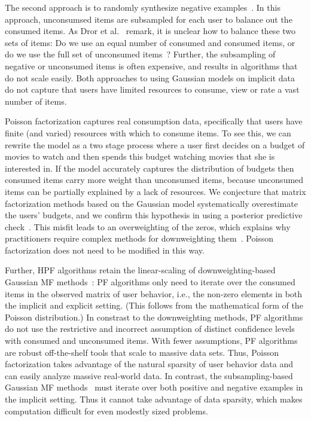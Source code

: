 The second approach is to randomly synthesize negative
examples~\cite{Dror:2012a, Gantner:2012p9364, Paquet:2013p9197}. In
this approach, unconsumsed items are subsampled for each user to
balance out the consumed items. As Dror et al.~\cite{Dror:2012a}
remark, it is unclear how to balance these two sets of items: Do we
use an equal number of consumed and consumed items, or do we use the
full set of unconsumed items~\cite{Cremonesi:2010, Hu:2008p9402}?
Further, the subsampling of negative or unconsumed items is often
expensive, and results in algorithms that do not scale easily. Both
approaches to using Gaussian models on implicit data do not capture
that users have limited resources to consume, view or rate a vast
number of items.

Poisson factorization captures real consumption data, specifically
that users have finite (and varied) resources with which to consume
items.  To see this, we can rewrite the model as a two stage process
where a user first decides on a budget of movies to watch and then
spends this budget watching movies that she is interested in. If the
model accurately captures the distribution of budgets then consumed
items carry more weight than unconsumed items, because unconsumed
items can be partially explained by a lack of resources. We conjecture
that matrix factorization methods based on the Gaussian model
systematically overestimate the users' budgets, and we confirm this
hypothesis in  using a posterior predictive
check~\cite{Gelman:1996}. This misfit leads to an overweighting of the
zeros, which explains why practitioners require complex methods for
downweighting
them~\cite{Hu:2008p9402,Gantner:2012p9364,Dror:2012a,Paquet:2013p9197}.
Poisson factorization does not need to be modified in this way.

Further, HPF algorithms retain the linear-scaling of
downweighting-based Gaussian MF methods~\cite{Hu:2008p9402}: PF
algorithms only need to iterate over the consumed items in the
observed matrix of user behavior, i.e., the non-zero elements in both
the implicit and explicit setting. (This follows from the mathematical
form of the Poisson distribution.) In constrast to the downweighting
methods, PF algorithms do not use the restrictive and incorrect
assumption of distinct confidence levels with consumed and unconsumed
items. With fewer assumptions, PF algorithms are robust off-the-shelf
tools that scale to massive data sets. Thus, Poisson factorization
takes advantage of the natural sparsity of user behavior data and can
easily analyze massive real-world data.  In contrast, the
subsampling-based Gaussian MF methods~\cite{Gantner:2012p9364,
  Dror:2012a,Paquet:2013p9197} must iterate over both positive and
negative examples in the implicit setting. Thus it cannot take
advantage of data sparsity, which makes computation difficult for even
modestly sized problems.

